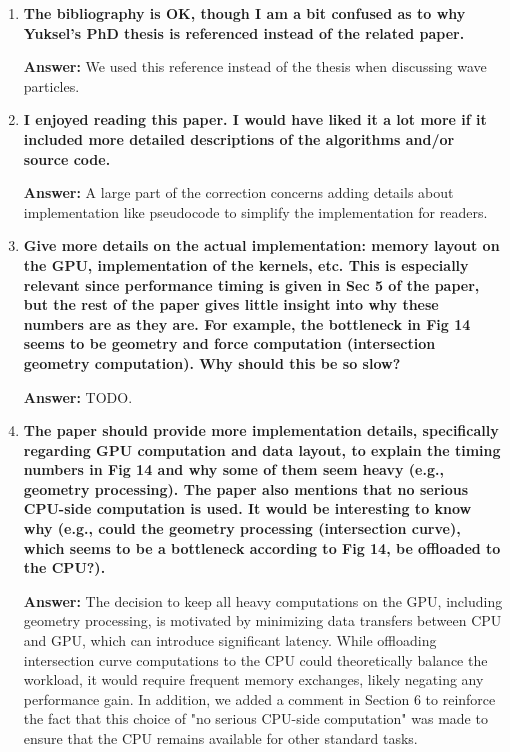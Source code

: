\documentclass{article}
\newcommand{\answer}[1]{\textbf{\textcolor{answercolor}{Answer:}} \textcolor{answercolor}{#1}}
\begin{document}
\begin{enumerate}[label=\textbf{\arabic*.}]
	\item \textbf{The bibliography is OK, though I am a bit confused as to why Yuksel's PhD thesis is referenced instead of the related paper.}

	      \answer{We used this reference instead of the thesis when discussing wave particles.}

	\item \textbf{I enjoyed reading this paper. I would have liked it a lot more if it included more detailed descriptions of the algorithms and/or source code.}

	      \answer{A large part of the correction concerns adding details about implementation like pseudocode to simplify the implementation for readers.}

	\item \textbf{Give more details on the actual implementation: memory layout on the GPU, implementation of the kernels, etc. This is especially relevant since performance timing is given in Sec 5 of the paper, but the rest of the paper gives little insight into why these numbers are as they are. For example, the bottleneck in Fig 14 seems to be geometry and force computation (intersection geometry computation). Why should this be so slow?}

	      \answer{TODO.}

	\item \textbf{The paper should provide more implementation details, specifically regarding GPU computation and data layout, to explain the timing numbers in Fig 14 and why some of them seem heavy (e.g., geometry processing). The paper also mentions that no serious CPU-side computation is used. It would be interesting to know why (e.g., could the geometry processing (intersection curve), which seems to be a bottleneck according to Fig 14, be offloaded to the CPU?).}

	      \answer{The decision to keep all heavy computations on the GPU, including geometry processing, is motivated by minimizing data transfers between CPU and GPU, which can introduce significant latency. While offloading intersection curve computations to the CPU could theoretically balance the workload, it would require frequent memory exchanges, likely negating any performance gain. In addition, we added a comment in Section 6 to reinforce the fact that this choice of "no serious CPU-side computation" was made to ensure that the CPU remains available for other standard tasks.}


\end{enumerate}
\end{document}
